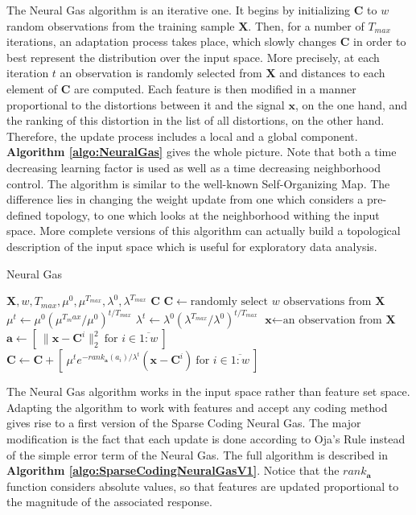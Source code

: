\documentclass[runningheads,a4paper]{llncs}
\newcommand{\hcrange}[2]{\overline{{#1}\colon\!\!{#2}}}
\begin{document}
The Neural Gas algorithm is an iterative one. It begins by initializing $\textbf{C}$ to $w$ random observations from the training sample $\textbf{X}$. Then, for a number of $T_{max}$ iterations, an adaptation process takes place, which slowly changes $\textbf{C}$ in order to best represent the distribution over the input space. More precisely, at each iteration $t$ an observation is randomly selected from $\textbf{X}$ and distances to each element of $\textbf{C}$ are computed. Each feature is then modified in a manner proportional to the distortions between it and the signal $\textbf{x}$, on the one hand, and the ranking of this distortion in the list of all distortions, on the other hand. Therefore, the update process includes a local and a global component. \textbf{Algorithm \ref{algo:NeuralGas}} gives the whole picture. Note that both a time decreasing learning factor is used as well as a time decreasing neighborhood control. The algorithm is similar to the well-known Self-Organizing Map. The difference lies in changing the weight update from one which considers a pre-defined topology, to one which looks at the neighborhood withing the input space. More complete versions of this algorithm \cite{neural-gas-1} can actually build a topological description of the input space which is useful for exploratory data analysis.

\begin{algorithm}[h!]
\caption{Neural Gas}
\label{algo:NeuralGas}
\begin{algorithmic}
\Require $\textbf{X},w,T_{max},\mu^0,\mu^{T_{max}},\lambda^0,\lambda^{T_{max}}$
\Ensure $\textbf{C}$
\State $\textbf{C} \gets \mbox{randomly select $w$ observations from $\textbf{X}$}$
\For {$t = \hcrange{1}{T_{max}}$}
\State $\mu^t \gets \mu^0 (\mu^{T_max} / \mu^0)^{t / T_{max}}$ 
\State $\lambda^t \gets \lambda^0 (\lambda^{T_{max}} / \lambda^0)^{t / T_{max}}$ 
\State $\textbf{x} \gets \text{an observation from $\textbf{X}$}$
\State $\textbf{a} \gets [ ~ \|\textbf{x} - \textbf{C}^i\|_2^2 ~ \mbox{for $i \in \hcrange{1}{w}$} ~ ]$
\State $\textbf{C} \gets \textbf{C} + [ ~ \mu^t e^{-rank_{\textbf{a}}(a_i) / \lambda^t} (\textbf{x} - \textbf{C}^i) ~ \mbox{for $i \in \hcrange{1}{w}$} ~ ]$
\EndFor
\end{algorithmic}
\end{algorithm}

The Neural Gas algorithm works in the input space rather than feature set space. Adapting the algorithm to work with features and accept any coding method gives rise to a first version of the Sparse Coding Neural Gas. The major modification is the fact that each update is done according to Oja's Rule \cite{oja-rule} instead of the simple error term of the Neural Gas. The full algorithm is described in \textbf{Algorithm \ref{algo:SparseCodingNeuralGasV1}}. Notice that the $rank_{\textbf{a}}$ function considers absolute values, so that features are updated proportional to the magnitude of the associated response.
\end{document}

